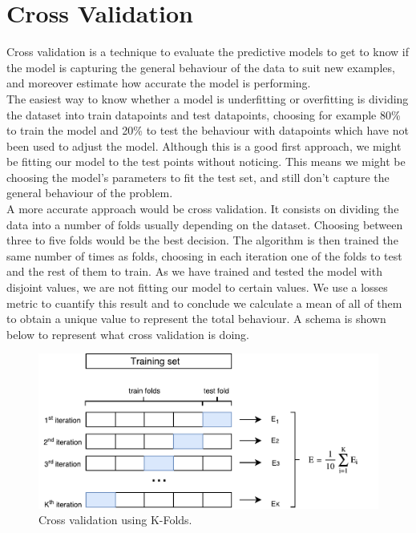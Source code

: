 \documentclass[a4paper,11pt,spanish]{report}
\begin{document}
\section{Cross Validation}
\label{sec:cv}

Cross validation is a technique to evaluate the predictive models to get to know if the model is capturing the general behaviour of the data to suit new examples, and moreover estimate how accurate the model is performing.\\
The easiest way to know whether a model is underfitting or overfitting is dividing the dataset into train datapoints and test datapoints, choosing for example 80\% to train the model and 20\% to test the behaviour with datapoints which have not been used to adjust the model. Although this is a good first approach, we might be fitting our model to the test points without noticing. This means we might be choosing the model's parameters to fit the test set, and still don't capture the general behaviour of the problem.\\
A more accurate approach would be cross validation. It consists on dividing the data into a number of folds usually depending on the dataset. Choosing between three to five folds would be the best decision. The algorithm is then trained the same number of times as folds, choosing in each iteration one of the folds to test and the rest of them to train. As we have trained and tested the model with disjoint values, we are not fitting our model to certain values. We use a losses metric to cuantify this result and to conclude we calculate a mean of all of them to obtain a unique value to represent the total behaviour. A schema is shown below to represent what cross validation is doing.\\

\begin{figure}[h]
\centering
\includegraphics[width=12cm]{figures/cv.pdf}
\caption{\label{figurefit}Cross validation using K-Folds.}
\end{figure}
\end{document}
